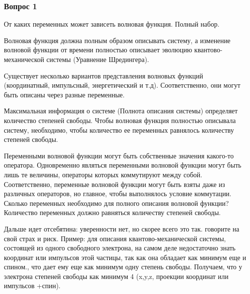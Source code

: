 \subsubsection{Вопрос 1}
От каких переменных может зависеть волновая функция. Полный набор.


Волновая функция должна полным образом описывать систему, а изменение волновой функции от времени полностью описывает эволюцию квантово-механической системы (Уравнение Шредингера). 

Существует несколько вариантов представления волновых функций (координатный, импульсный, энергетический и т.д). Соответственно, они могут быть описаны через разные переменные. 

Максимальная информация о системе (Полнота описания системы) определяет количество степеней свободы. Чтобы волновая функция полностью описывала систему, необходимо, чтобы количество ее переменных равнялось количеству степеней свободы. 

Переменными волновой функции могут быть собственные значения какого-то оператора. Одновременно являться переменными волновой функции могут быть лишь те величины, операторы которых коммутируют между собой. Соответственно, переменные волновой функции могут быть взяты даже из различных операторов, но главное, чтобы выполнялось условие коммутации. Сколько переменных необходимо для полного описания волновой функции? Количество переменных должно равняться количеству степеней свободы.

Дальше идет отсебятина: уверенности нет, но скорее всего это так. говорите на свой страх и риск. 
 Пример: для описания квантово-механической системы, состоящей из одного свободного электрона, на самом деле недостаточно знать координат или импульсов этой частицы, так как она обладает как минимум еще и спином., что дает ему еще как минимум одну степень свободы. Получаем, что у электрона степеней свободы как минимум 4 (x,y,z, проекции координат или импульсов +спин). 
